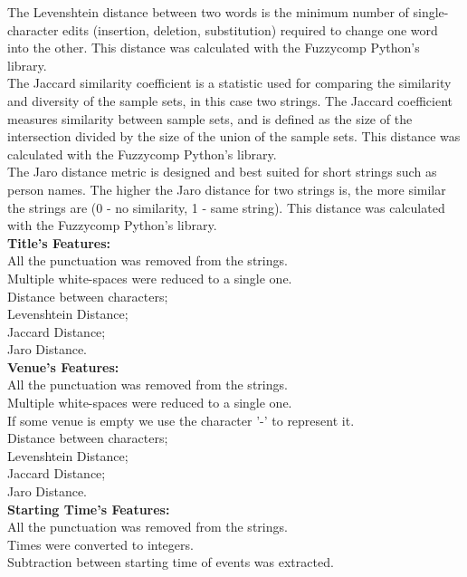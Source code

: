 \documentclass[english, a4paper, 12pt]{article}
\newcommand{\tab}{\hspace*{2em}}
\begin{document}
\tab {\bf Levenshtein's Distance - }The Levenshtein distance between two words is the minimum number of single-character edits (insertion, deletion, substitution) required to change one word into the other. This distance was calculated with the Fuzzycomp Python's library.\medskip\\

\tab  {\bf Jaccard's Distance - }The Jaccard similarity coefficient is a statistic used for comparing the similarity and diversity of the sample sets, in this case two strings. The Jaccard coefficient measures similarity between sample sets, and is defined as the size of the intersection divided by the size of the union of the sample sets. This distance was calculated with the Fuzzycomp Python's library.\medskip\\

\tab  {\bf Jaro's characters - } The Jaro distance metric is designed and best suited for short strings such as person names. The higher the Jaro distance for two strings is, the more similar the strings are (0 - no similarity, 1 - same string).  This distance was calculated with the Fuzzycomp Python's library.
\medskip\\

\bigskip
{\bf Title's Features:}\medskip\\
\tab  All the punctuation was removed from the strings.\\
\tab  Multiple white-spaces were reduced to a single one.\\
\tab  Distance between characters;\\
\tab  Levenshtein Distance;\\
\tab  Jaccard Distance;\\
\tab  Jaro Distance.\medskip\\

{\bf Venue's Features:}\medskip\\
\tab  All the punctuation was removed from the strings.\\
\tab  Multiple white-spaces were reduced to a single one.\\
\tab  If some venue is empty we use the character '-' to represent it.\\
\tab  Distance between characters;\\
\tab  Levenshtein Distance;\\
\tab  Jaccard Distance;\\
\tab  Jaro Distance.\medskip\\

\pagebreak
{\bf Starting Time's Features:}\medskip\\
\tab  All the punctuation was removed from the strings.\\
\tab  Times were converted to integers.\\
\tab  Subtraction between starting time of events was extracted.\medskip\\
\end{document}
